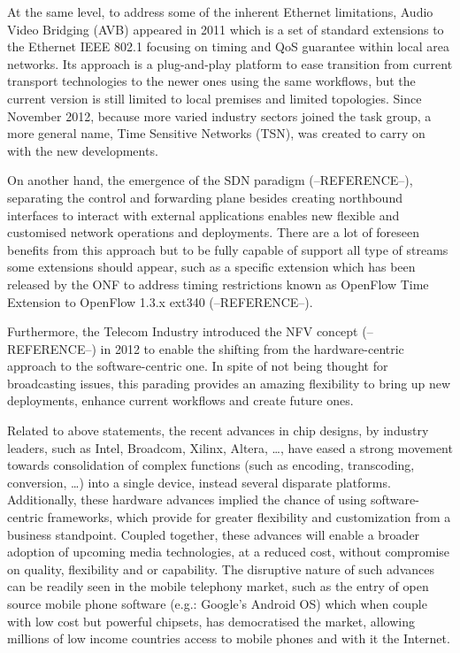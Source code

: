 At the same level, to address some of the inherent Ethernet limitations, Audio Video Bridging (AVB) appeared in 2011 which is a set of standard extensions to the Ethernet IEEE 802.1 focusing on timing and QoS guarantee within local area networks. Its approach is a plug-and-play platform to ease transition from current transport technologies to the newer ones using the same workflows, but the current version is still limited to local premises and limited topologies. Since November 2012, because more varied industry sectors joined the task group, a more general name, Time Sensitive Networks (TSN), was created to carry on with the new developments.

On another hand, the emergence of the SDN paradigm (--REFERENCE--), separating the control and forwarding plane besides creating northbound interfaces to interact with external applications enables new flexible and customised network operations and deployments. There are a lot of foreseen benefits from this approach but to be fully capable of support all type of streams some extensions should appear, such as a specific extension which has been released by the ONF to address timing restrictions known as OpenFlow Time Extension to OpenFlow 1.3.x ext340 (--REFERENCE--).

Furthermore, the Telecom Industry introduced the NFV concept (--REFERENCE--) in 2012 to enable the shifting from the hardware-centric approach to the software-centric one. In spite of not being thought for
broadcasting issues, this parading provides an amazing flexibility to bring up new deployments, enhance current workflows and create future ones.

Related to above statements, the recent advances in chip designs, by industry leaders, such as Intel, Broadcom, Xilinx, Altera, \ldots, have eased a strong movement towards consolidation of complex functions (such as encoding, transcoding, conversion, \ldots ) into a single device, instead
several disparate platforms. Additionally, these hardware advances implied the chance of using software-centric frameworks, which provide for greater flexibility and customization from a business standpoint. Coupled together, these advances will enable a broader adoption of upcoming media technologies, at a reduced cost, without compromise on quality, flexibility and or capability. The disruptive nature of such advances can be readily seen in the mobile telephony market, such as the entry of open source mobile phone software (e.g.: Google’s Android OS) which when couple with low cost but powerful chipsets, has democratised the market, allowing millions of low income countries access to mobile phones and with it the Internet.

